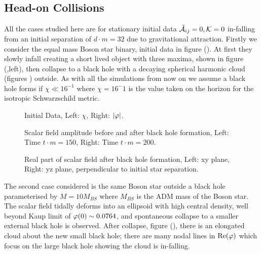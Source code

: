 \subsection{Head-on Collisions}
All the cases studied here are for stationary initial data $\tilde{\mathcal{A}}_{ij}=0,\mathcal{K}=0$ in-falling from an initial separation of $d \cdot m = 32$ due to gravitational attraction. Firstly we consider the equal mass Boson star binary, initial data in figure (). At first they slowly infall creating a short lived object with three maxima, shown in figure (,left), then collapse to a black hole with a decaying spherical harmonic cloud (figures ) outside. As with all the simulations from now on we assume a black hole forms if $\chi \ll 16^{-1}$ where $\chi=16^-1$ is the value taken on the horizon for the isotropic Schwarzschild metric.
  \begin{figure}[h!]
  \caption{Initial Data, Left: $\chi$, Right: $|\varphi|$.}
  \centering
  \hfill
\end{figure}
  \begin{figure}[h!]
  \caption{Scalar field amplitude before and after black hole formation, Left: Time $t\cdot m = 150$, Right: Time $t \cdot m = 200$.}
  \centering
  \hfill
\end{figure}
   \begin{figure}[h!]
  \caption{Real part of scalar field after black hole formation, Left: xy plane, Right: yz plane, perpendicular to initial star separation.}
  \centering
  \hfill
\end{figure}
 
The second case considered is the same Boson star outside a black hole parameterised by $M=10M_{BS}$ where $M_{BS}$ is the ADM mass of the Boson star. The scalar field tidally deforms into an ellipsoid with high central density, well beyond Kaup limit of $\varphi(0)\sim 0.0764$, and spontaneous collapse to a smaller external black hole is observed. After collapse, figure (), there is an elongated cloud about the new small black hole; there are many nodal lines in $\mathrm{Re}(\varphi)$ which focus on the large black hole showing the cloud is in-falling.

